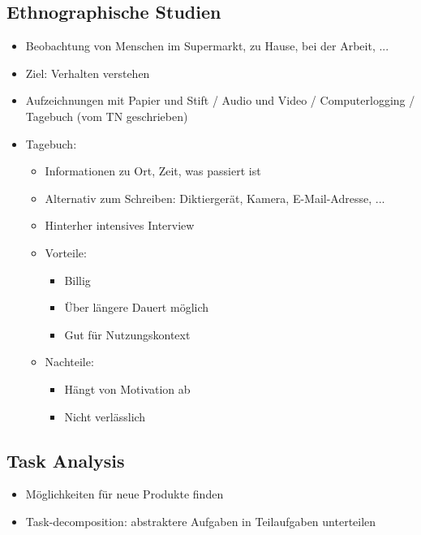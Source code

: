 \documentclass[a4paper,10pt]{article}
\begin{document}
\subsection{Ethnographische Studien}
\begin{itemize}
	\item Beobachtung von Menschen im Supermarkt, zu Hause, bei der Arbeit, ...
	\item Ziel: Verhalten verstehen
	\item Aufzeichnungen mit Papier und Stift / Audio und Video / Computerlogging / Tagebuch (vom TN geschrieben)
	\item Tagebuch:
	\begin{itemize}
		\item Informationen zu Ort, Zeit, was passiert ist
		\item Alternativ zum Schreiben: Diktiergerät, Kamera, E-Mail-Adresse, ...
		\item Hinterher intensives Interview
		\item Vorteile:
		\begin{itemize}
			\item Billig
			\item Über längere Dauert möglich
			\item Gut für Nutzungskontext
		\end{itemize}
		\item Nachteile:
		\begin{itemize}
			\item Hängt von Motivation ab
			\item Nicht verlässlich
		\end{itemize}
	\end{itemize}
\end{itemize}

\subsection{Task Analysis}
\begin{itemize}
	\item Möglichkeiten für neue Produkte finden
	\item Task-decomposition: abstraktere Aufgaben in Teilaufgaben unterteilen
\end{itemize}
\end{document}
